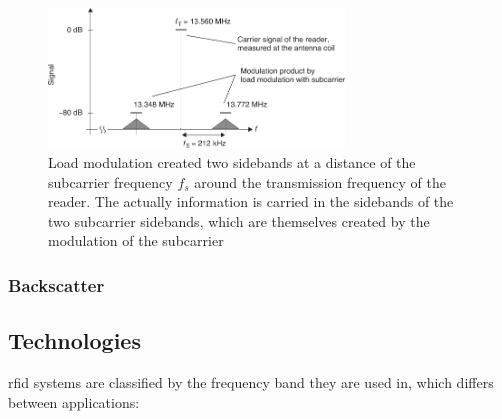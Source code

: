 \begin{figure}[!ht]
    \centering
    \includegraphics[width=0.7\textwidth]{./figs/02-state-of-the-art/loadmodulation_sidebands.pdf}
    \caption{Load modulation created two sidebands at a distance of the subcarrier frequency $f_s$ around the transmission frequency of the reader. The actually information is carried in the sidebands of the two subcarrier sidebands, which are themselves created by the modulation of the subcarrier ~\cite{finkenzellerRFIDHandbookFundamentals2003}} 
    \label{fig:loadmodulationsidebands}
\end{figure}

\subsubsection{Backscatter}



\subsection{Technologies} \label{sec:opfrequency}


\ac{rfid} systems are classified by the frequency band they are used in, which differs between applications:

